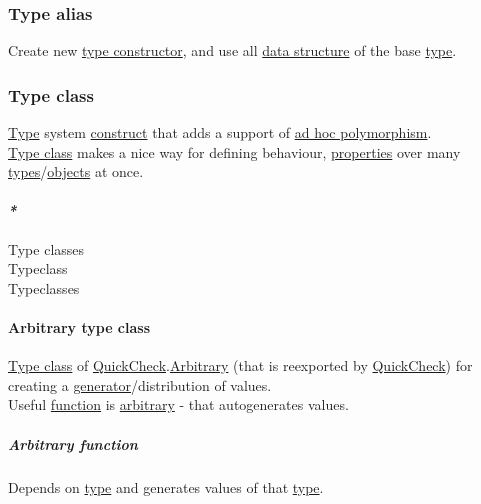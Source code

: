 \documentclass[11pt]{article}
\begin{document}
\subsubsection{\label{org3912c71}Type alias}
\label{sec:orgd4b3de6}
Create new \hyperref[org7285f45]{type constructor}, and use all \hyperref[org47669ca]{data structure} of the base \hyperref[org4fbaeb8]{type}.\\

\subsubsection{\label{orga4a5066}Type class}
\label{sec:org6844aef}
\hyperref[org4fbaeb8]{Type} system \hyperref[orgc1046f9]{construct} that adds a support of \hyperref[orgdf8c6be]{ad hoc polymorphism}.\\

\hyperref[orga4a5066]{Type class} makes a nice way for defining behaviour, \hyperref[org763ad6b]{properties} over many \hyperref[org3927fd9]{types}/\hyperref[orge0f000f]{objects} at once.\\

\paragraph{\emph{*}}
\label{sec:orgefc8aa6}

\label{org2efac60}Type classes\\
\label{orgd448256}Typeclass\\
\label{org26684a8}Typeclasses\\

\paragraph{\label{orge84d79d}Arbitrary type class}
\label{sec:org1518f8d}
\hyperref[orga4a5066]{Type class} of \hyperref[org85396c2]{QuickCheck}.\hyperref[orgbfdf9b7]{Arbitrary} (that is reexported by \hyperref[org85396c2]{QuickCheck}) for creating a \hyperref[org7808460]{generator}/distribution of values.\\
Useful \hyperref[orgeb5cddb]{function} is \hyperref[orgbfdf9b7]{arbitrary} - that autogenerates values.\\

\subparagraph{\label{org43a0072}Arbitrary function}
\label{sec:orgee77d5e}
Depends on \hyperref[org4fbaeb8]{type} and generates values of that \hyperref[org4fbaeb8]{type}.\\
\end{document}
